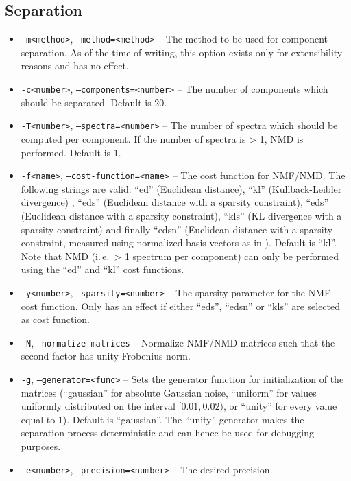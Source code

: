 \subsection{Separation}

\begin{itemize}
  \item {\tt -m<method>}, {\tt --method=<method>} -- The method to be used
    for component separation. As of the time of writing, this option exists
    only for extensibility reasons and has no effect.
  \item {\tt -c<number>}, {\tt --components=<number>} -- The number of
    components which should be separated. Default is 20.
  \item {\tt -T<number>}, {\tt --spectra=<number>} -- The number of spectra
    which should be computed per component. If the number of spectra is > 1,
    NMD is performed. Default is 1.
  \item {\tt -f<name>}, {\tt --cost-function=<name>} -- The cost function for
    NMF/NMD. The following strings are valid: ``ed'' (Euclidean distance),
    ``kl'' (Kullback-Leibler divergence) \cite{LeeSeung2001}, ``eds'' (Euclidean distance with a 
    sparsity constraint), ``eds'' (Euclidean distance with a sparsity constraint),
    ``kls'' (KL divergence with a sparsity constraint) \cite{Virtanen2007} and finally ``edsn'' 
    (Euclidean distance with a sparsity constraint, measured using normalized
    basis vectors as in \cite{Eggert2004}). Default is ``kl''. Note that NMD
    (i.\,e.\ > 1 spectrum per component) can only be performed using the ``ed''
    and ``kl'' cost functions.
  \item {\tt -y<number>}, {\tt --sparsity=<number>} -- The sparsity parameter
    for the NMF cost function. Only has an effect if either ``eds'', ``edsn''
    or ``kls'' are selected as cost function.
  \item {\tt -N}, {\tt --normalize-matrices} -- Normalize NMF/NMD matrices such
    that the second factor has unity Frobenius norm.
  \item {\tt -g}, {\tt --generator=<func>} -- Sets the generator function for
    initialization of the matrices (``gaussian'' for absolute Gaussian noise, 
    ``uniform'' for values uniformly distributed on the interval $[0.01,0.02)$,
    or ``unity'' for every value equal to 1). Default is ``gaussian''.
    The ``unity'' generator makes the separation process deterministic and can
    hence be used for debugging purposes.
  \item {\tt -e<number>}, {\tt --precision=<number>} -- The desired precision

\end{itemize}

